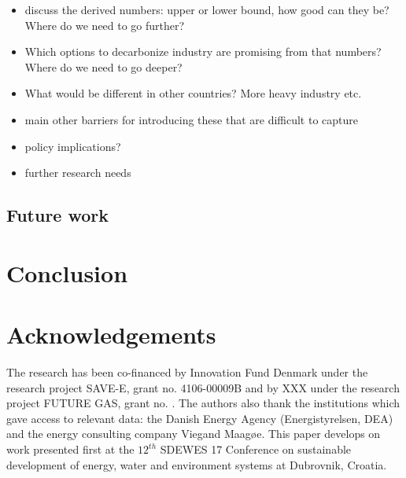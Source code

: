 \documentclass[review]{elsarticle}
\begin{document}
\begin{itemize}
    \item discuss the derived numbers: upper or lower bound, how good can they be? Where do we need to go further?
    \item Which options to decarbonize industry are promising from that numbers? Where do we need to go deeper?
    \item What would be different in other countries? More heavy industry etc.
    \item main other barriers for introducing these that are difficult to capture
    \item policy implications?
    \item further research needs
\end{itemize}

\subsection{Future work}


\section{Conclusion} \label{endofpaper}





\section*{Acknowledgements}
The research has been co-financed by Innovation Fund Denmark under the research project SAVE-E, grant no. 4106-00009B and by XXX under the research project FUTURE GAS, grant no. .
The authors also thank the institutions which gave access to relevant data: the Danish Energy Agency (Energistyrelsen, DEA) and the energy consulting company Viegand Maagøe.
This paper develops on work presented first at the $12^{th}$ SDEWES 17 Conference on sustainable development of energy, water and environment systems at Dubrovnik, Croatia.
\end{document}

